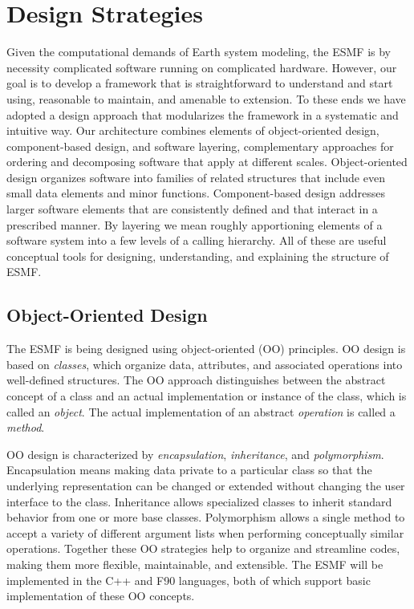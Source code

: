 \section{Design Strategies}
\label{sec:strategies}

Given the computational demands of Earth system modeling, the ESMF is by 
necessity complicated software running on complicated hardware.  However,
our goal is to develop a framework that is straightforward to understand and 
start using, reasonable to maintain, and amenable to extension.  To these 
ends we have adopted a design approach that modularizes the framework in a 
systematic and intuitive way.  Our architecture combines elements of 
object-oriented design, component-based design, and software layering, 
complementary approaches for ordering and decomposing software that apply
at different scales.  Object-oriented design organizes software into families 
of related structures that include even 
small data elements and minor functions.  Component-based design addresses 
larger software elements that are consistently defined and that interact
in a prescribed manner.  By layering we mean roughly apportioning elements 
of a software system into a few levels of a calling hierarchy.
All of these are useful conceptual tools for designing, understanding, and
explaining the structure of ESMF.

\subsection{Object-Oriented Design}

The ESMF is being designed using object-oriented (OO) principles.  OO design
is based on {\it classes}, which organize data, attributes, and associated 
operations into well-defined structures.  The OO approach distinguishes between 
the abstract concept of a class and an actual implementation or instance of the 
class, which is called an {\it object}.  The actual implementation of an 
abstract {\it operation} is called a {\it method}.

OO design is characterized by {\it encapsulation}, {\it inheritance}, and 
{\it polymorphism}.  Encapsulation means making data 
private to a particular class so that the underlying representation
can be changed or extended without changing the user interface to the class.
Inheritance allows specialized classes to inherit standard behavior from one
or more base
classes.  Polymorphism allows a single method to accept a variety of 
different argument lists when performing conceptually similar operations.  
Together these OO strategies help to organize and streamline codes, making 
them more flexible, maintainable, and extensible.  The ESMF will be
implemented in the C++ and F90 languages, both of which support basic 
implementation of these OO concepts.



